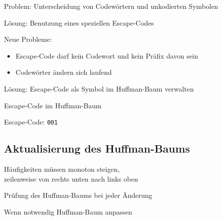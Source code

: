 \documentclass[xcolor=dvipsnames,presentation]{beamer}    %
\newenvironment{witemize}{\itemize\setlength{\itemsep}{1em}}{\enditemize}
\begin{document}
\begin{frame}{\insertsection}
  \begin{witemize}
    \item Problem: Unterscheidung von Codewörtern und unkodierten
      Symbolen
    \item Lösung: Benutzung eines speziellen Escape-Codes
    \item Neue Probleme:
      \begin{itemize}
      \item Escape-Code darf kein Codewort und kein Präfix davon sein
      \item Codewörter ändern sich laufend
      \end{itemize}
    \item Lösung: Escape-Code als Symbol im Huffman-Baum verwalten
  \end{witemize}
\end{frame}

\begin{frame}[<+->]{Escape-Code im Huffman-Baum}
\begin{figure}
\end{figure}
Escape-Code: {\tt001}
\end{frame}

\subsection{Aktualisierung des Huffman-Baums}

\begin{frame}{\insertsubsection}
  \begin{witemize}
  \item Häufigkeiten müssen monoton steigen, \\
    zeilenweise von rechts unten nach links oben
  \item Prüfung des Huffman-Baums bei jeder Änderung
  \item Wenn notwendig Huffman-Baum anpassen
  \end{witemize}
\end{frame}
\end{document}
